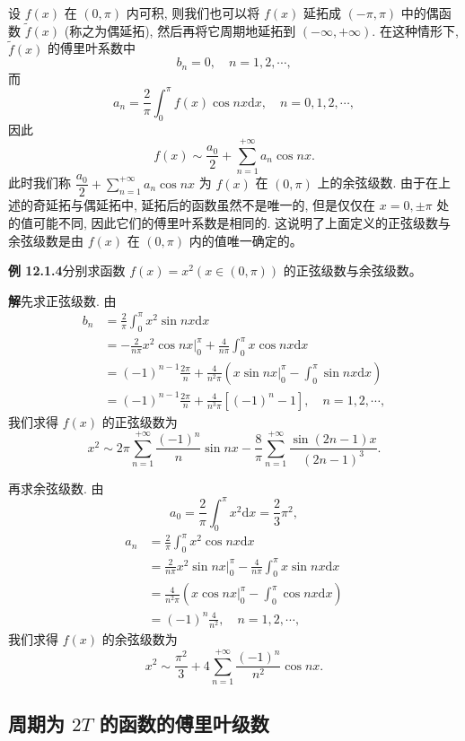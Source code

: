 \documentclass[UTF8, 12pt, fontset=fandol, oneside]{ctexart}
\begin{document}
设 $f(x)$ 在 $(0,\pi)$ 内可积, 则我们也可以将 $f(x)$ 延拓成 $(-\pi,\pi)$ 中的偶函数 $\widetilde f(x)$ (称之为偶延拓), 然后再将它周期地延拓到 $(-\infty,+\infty)$. 在这种情形下, $\widetilde f(x)$ 的傅里叶系数中
\[
  b_n=0,\quad n=1,2,\cdots,
\]
而
\[
  a_n=\frac2\pi\int_0^\pi f(x)\cos nx\mathrm dx,\quad n=0,1,2,\cdots,
\]
因此
\[
  f(x)\sim\frac{a_0}{2}+\sum_{n=1}^{+\infty}a_n\cos nx.
\]
此时我们称 $\dfrac{a_0}{2}+\sum\limits_{n=1}^{+\infty}a_n\cos nx$ 为 $f(x)$ 在 $(0,\pi)$ 上的余弦级数. 由于在上述的奇延拓与偶延拓中, 延拓后的函数虽然不是唯一的, 但是仅仅在 $x=0,\pm\pi$ 处的值可能不同, 因此它们的傅里叶系数是相同的. 这说明了上面定义的正弦级数与余弦级数是由 $f(x)$ 在 $(0,\pi)$ 内的值唯一确定的。

\noindent\textbf{例 12.1.4}\quad 分别求函数 $f(x)=x^2(x\in(0,\pi))$ 的正弦级数与余弦级数。

\noindent\textbf{解}\quad 先求正弦级数. 由
\[
\begin{aligned}
  b_n
  &=\frac2\pi\int_0^\pi x^2\sin nx\mathrm dx\\
  &=-\frac2{n\pi}x^2\cos nx\bigg|_0^\pi
    +\frac4{n\pi}\int_0^\pi x\cos nx\mathrm dx\\
  &=(-1)^{n-1}\frac{2\pi}{n}
    +\frac4{n^2\pi}\left(x\sin nx\bigg|_0^\pi-\int_0^\pi\sin nx\mathrm dx\right)\\
  &=(-1)^{n-1}\frac{2\pi}{n}
    +\frac4{n^3\pi}[(-1)^n-1],\quad n=1,2,\cdots,
\end{aligned}
\]
我们求得 $f(x)$ 的正弦级数为
\[
  x^2\sim
  2\pi\sum_{n=1}^{+\infty}\frac{(-1)^n}{n}\sin nx
  -\frac8\pi\sum_{n=1}^{+\infty}\frac{\sin(2n-1)x}{(2n-1)^3}.
\]

再求余弦级数. 由
\[
  a_0=\frac2\pi\int_0^\pi x^2\mathrm dx=\frac23\pi^2,
\]
\[
\begin{aligned}
  a_n
  &=\frac2\pi\int_0^\pi x^2\cos nx\mathrm dx\\
  &=\frac2{n\pi}x^2\sin nx\bigg|_0^\pi
    -\frac4{n\pi}\int_0^\pi x\sin nx\mathrm dx\\
  &=\frac4{n^2\pi}\left(x\cos nx\bigg|_0^\pi-\int_0^\pi\cos nx\mathrm dx\right)\\
  &=(-1)^n\frac4{n^2},\quad n=1,2,\cdots,
\end{aligned}
\]
我们求得 $f(x)$ 的余弦级数为
\[
  x^2\sim\frac{\pi^2}{3}
  +4\sum_{n=1}^{+\infty}\frac{(-1)^n}{n^2}\cos nx.
\]

\subsection{周期为 $2T$ 的函数的傅里叶级数}
\end{document}
